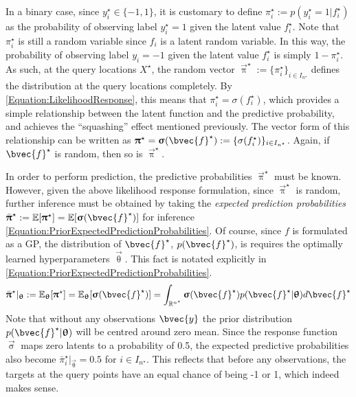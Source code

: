 				In a binary case, since $y^{\star}_{i} \in \{-1, 1\}$, it is customary to define $\pi^{\star}_{i} := p(y^{\star}_{i} = 1 | f^{\star}_{i})$ as the probability of observing label $y^{\star}_{i} = 1$ given the latent value $f^{\star}_{i}$. Note that $\pi^{\star}_{i}$ is still a random variable since $f_{i}$ is a latent random variable. In this way, the probability of observing label $y_{i} = -1$ given the latent value $f^{\star}_{i}$ is simply $1 - \pi^{\star}_{i}$. As such, at the query locations $X^{\star}$, the random vector $\vec{\uppi}^{\star} := \{\pi^{\star}_{i}\}_{i \in I_{n^{\star}}}$ defines the distribution at the query locations completely. By \eqref{Equation:LikelihoodResponse}, this means that $\pi^{\star}_{i} = \sigma(f^{\star}_{i})$, which provides a simple relationship between the latent function and the predictive probability, and achieves the ``squashing'' effect mentioned previously. The vector form of this relationship can be written as $\vec{\uppi}^{\star} = \vec{\upsigma}(\bvec{f}^{\star}) := \{\sigma(f^{\star}_{i})\}_{i \in I_{n^{\star}}}$. Again, if $\bvec{f}^{\star}$ is random, then so is $\vec{\uppi}^{\star}$.
				
				In order to perform prediction, the predictive probabilities $\vec{\uppi}^{\star}$ must be known. However, given the above likelihood response formulation, since $\vec{\uppi}^{\star}$ is random, further inference must be obtained by taking the \textit{expected prediction probabilities} $\bar{\vec{\uppi}}^{\star} := \mathbb{E}[\vec{\uppi}^{\star}] = \mathbb{E}[\vec{\upsigma}(\bvec{f}^{\star})]$ for inference \eqref{Equation:PriorExpectedPredictionProbabilities}. Of course, since $f$ is formulated as a GP, the distribution of $\bvec{f}^{\star}$, $p(\bvec{f}^{\star})$, is requires the optimally learned hyperparameters $\vec{\uptheta}$. This fact is notated explicitly in \eqref{Equation:PriorExpectedPredictionProbabilities}. \begin{equation}
					\bar{\vec{\uppi}}^{\star} |_{\vec{\uptheta}} := \mathbb{E}_{\vec{\uptheta}}[\vec{\uppi}^{\star}] = \mathbb{E}_{\vec{\uptheta}}[\vec{\upsigma}(\bvec{f}^{\star})] = \int_{\mathbb{R}^{n^{\star}}} \vec{\upsigma}(\bvec{f}^{\star}) p(\bvec{f}^{\star} | \vec{\uptheta}) d \bvec{f}^{\star}
				\label{Equation:PriorExpectedPredictionProbabilities}
				\end{equation} Note that without any observations $\bvec{y}$ the prior distribution $p(\bvec{f}^{\star} | \vec{\uptheta})$ will be centred around zero mean. Since the response function $\vec{\upsigma}$ maps zero latents to a probability of 0.5, the expected predictive probabilities also become $\bar{\pi}^{\star}_{i} |_{\vec{\uptheta}} = 0.5$ for $i \in I_{n^{\star}}$. This reflects that before any observations, the targets at the query points have an equal chance of being -1 or 1, which indeed makes sense.
				 
